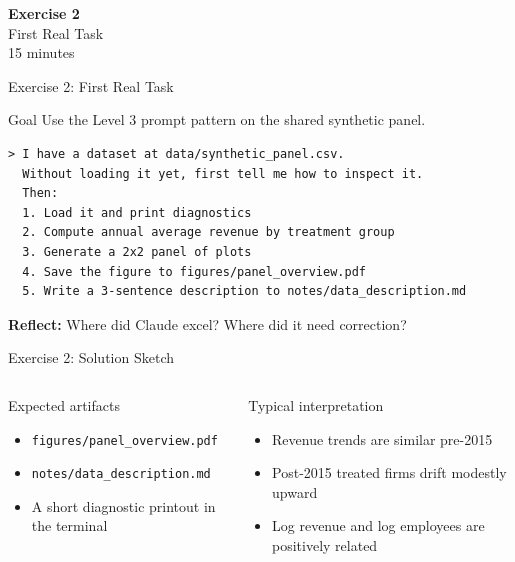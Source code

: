 \documentclass[aspectratio=169,10pt]{beamer}
\begin{document}
\begin{frame}{}
\vfill\begin{center}{\Huge \textcolor{uzhblue}{\textbf{Exercise 2}}}\\[12pt]
{\LARGE First Real Task}\\[6pt]{\small 15 minutes}\end{center}\vfill
\end{frame}

\begin{frame}[fragile]{Exercise 2: First Real Task}
\begin{exampleblock}{Goal}
Use the Level 3 prompt pattern on the shared synthetic panel.
\end{exampleblock}
\small
\begin{lstlisting}[style=prompt, basicstyle=\scriptsize\ttfamily]
> I have a dataset at data/synthetic_panel.csv.
  Without loading it yet, first tell me how to inspect it.
  Then:
  1. Load it and print diagnostics
  2. Compute annual average revenue by treatment group
  3. Generate a 2x2 panel of plots
  4. Save the figure to figures/panel_overview.pdf
  5. Write a 3-sentence description to notes/data_description.md
\end{lstlisting}

\textbf{Reflect:} Where did Claude excel? Where did it need correction?
\end{frame}

\begin{frame}{Exercise 2: Solution Sketch}
\small
\begin{columns}[T]
\begin{exampleblock}{Expected artifacts}
\begin{itemize}\itemsep1pt
    \item \texttt{figures/panel\_overview.pdf}
    \item \texttt{notes/data\_description.md}
    \item A short diagnostic printout in the terminal
\end{itemize}
\end{exampleblock}

\begin{alertblock}{Typical interpretation}
\begin{itemize}\itemsep1pt
    \item Revenue trends are similar pre-2015
    \item Post-2015 treated firms drift modestly upward
    \item Log revenue and log employees are positively related
\end{itemize}
\end{alertblock}
\end{columns}
\end{frame}
\end{document}
